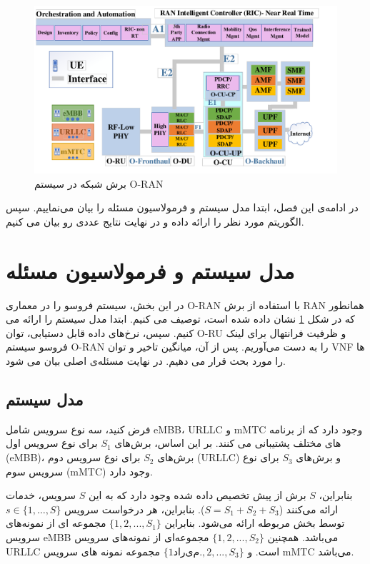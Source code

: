 \begin{figure}
  \centering
  \captionsetup{justification=centering}
    \includegraphics[scale = 0.4]{./img/finalDraw1.pdf}
  \caption{برش شبکه در سیستم O-RAN}
  \label{fig:c11}
\end{figure}
در ادامه‌ی این فصل، ابتدا مدل سیستم و فرمولاسیون مسئله را بیان می‌نماییم. سپس الگوریتم مورد نظر را ارائه داده و در نهایت     نتایج عددی رو بیان می کنیم.

\section{مدل سیستم و فرمولاسیون مسئله}\label{systemmodel}
در این بخش، سیستم فروسو  را در معماری O-RAN با استفاده از برش RAN همانطور که در شکل \ref{fig:c11} نشان داده شده است، توصیف می کنیم.
ابتدا مدل سیستم را ارائه می کنیم. سپس، نرخ‌های داده قابل دستیابی، توان O-RU و ظرفیت فرانتهال برای لینک فروسو سیستم O-RAN را به دست می‌آوریم. پس از آن، میانگین تاخیر و توان VNF ها را مورد بحث قرار می دهیم.
در نهایت مسئله‌ی اصلی بیان می شود.
\subsection{مدل سیستم}
فرض کنید، سه نوع سرویس شامل eMBB، URLLC و mMTC وجود دارد که از برنامه های مختلف پشتیبانی می کنند.
بر این اساس، برش‌های $S_1$ برای نوع سرویس اول (eMBB)، برش‌های $S_2$ برای نوع سرویس دوم (URLLC) و برش‌های $S_3$ برای نوع سرویس سوم (mMTC) وجود دارد.

بنابراین،  $S$ برش‌ از پیش تخصیص داده شده وجود دارد که به این $S$ سرویس، خدمات ارائه می‌کنند ($S = S_1 + S_2 + S_3$).
بنابراین، هر درخواست سرویس $s\in \{1,\ldots,S\}$ توسط بخش مربوطه ارائه می‌شود.
بنابراین  $\{1,2,...,S_1\}$ 
مجموعه ای از نمونه‌های سرویس 
eMBB
می‌باشد. همچنین
 $\{1,2,...,S_2\}$ 
  مجموعه‌ای از نمونه‌های سرویس  URLLC
  است. 
   و $\{1 داریم. ,2,...,S_3\}$ مجموعه نمونه های سرویس mMTC می‌باشد.
   

